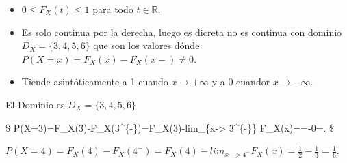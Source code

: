 \documentclass[]{article}
\providecommand{\tightlist}{%
  \setlength{\itemsep}{0pt}\setlength{\parskip}{0pt}}
\begin{document}
\begin{itemize}
\tightlist
\item
  \(0\leq F_X(t)\leq 1\) para todo \(t\in \mathbb{R}.\)
\item
  Es solo continua por la derecha, luego es dicreta no es continua con
  dominio \(D_X=\{3,4,5,6\}\) que son los valores dónde
  \(P(X=x)=F_X(x)-F_X(x-)\not=0\).
\item
  Tiende asintóticamente a 1 cuando \(x\to+\infty\) y a 0 cuandor
  \(x\to-\infty\).
\end{itemize}

El Dominio es \(D_X=\{3,4,5,6\}\)

\$ P(X=3)=F\_X(3)-F\_X(3\^{}\{-\})=F\_X(3)-lim\_\{x-\textgreater{}
3\^{}\{-\}\} F\_X(x)==-0=. \$

\(P(X=4)=F_X(4)-F_X(4^{-})=F_X(4)-lim_{x-> 4^{-}} F_X(x)=\frac{1}{2}-\frac{1}{3}=\frac{1}{6}.\)
\end{document}
